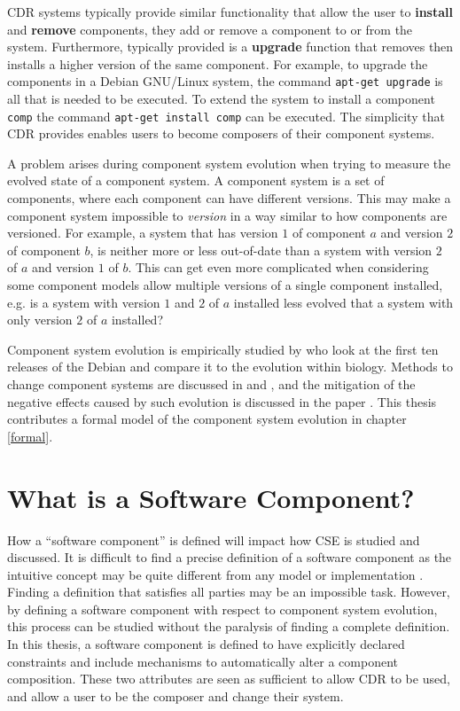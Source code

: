 CDR systems typically provide similar functionality that allow the user to \textbf{install} and \textbf{remove} components, they add or remove a component to or from the system.
Furthermore, typically provided is a \textbf{upgrade} function that removes then installs a higher version of the same component.
For example, to upgrade the components in a Debian GNU/Linux system, the command \texttt{apt-get upgrade} is all that is needed to be executed.
To extend the system to install a component \texttt{comp} the command \texttt{apt-get install comp} can be executed.
The simplicity that CDR provides enables users to become composers of their component systems.

A problem arises during component system evolution when trying to measure the evolved state of a component system.
A component system is a set of components, where each component can have different versions.
This may make a component system impossible to \textit{version} in a way similar to how components are versioned.
For example, a system that has version $1$ of component $a$ and version $2$ of component $b$, 
is neither more or less out-of-date than a system with version $2$ of $a$ and version $1$ of $b$.
This can get even more complicated when considering some component models allow multiple versions of a single component installed, e.g. 
is a system with version $1$ and $2$ of $a$ installed less evolved that a system with only version $2$ of $a$ installed?

Component system evolution is empirically studied by \cite{fortuna2011} 
who look at the first ten releases of the Debian and compare it to the evolution within biology.
Methods to change component systems are discussed in \citep{Ryan2005} and \citep{Luo2004},
and the mitigation of the negative effects caused by such evolution is discussed in the paper \citep{Stuckenholz2007}.
This thesis contributes a formal model of the component system evolution in chapter \ref{formal}.

\section{What is a Software Component?}
\label{background.components}
How a ``software component'' is defined will impact how CSE is studied and discussed.
It is difficult to find a precise definition of a software component as the intuitive concept may be quite different from any model or implementation \citep{Crnkovic2011}.
Finding a definition that satisfies all parties may be an impossible task.
However, by defining a software component with respect to component system evolution, 
this process can be studied without the paralysis of finding a complete definition.
In this thesis, a software component is defined to have explicitly declared constraints and include mechanisms to automatically alter a component composition.
These two attributes are seen as sufficient to allow CDR to be used, and allow a user to be the composer and change their system. 

